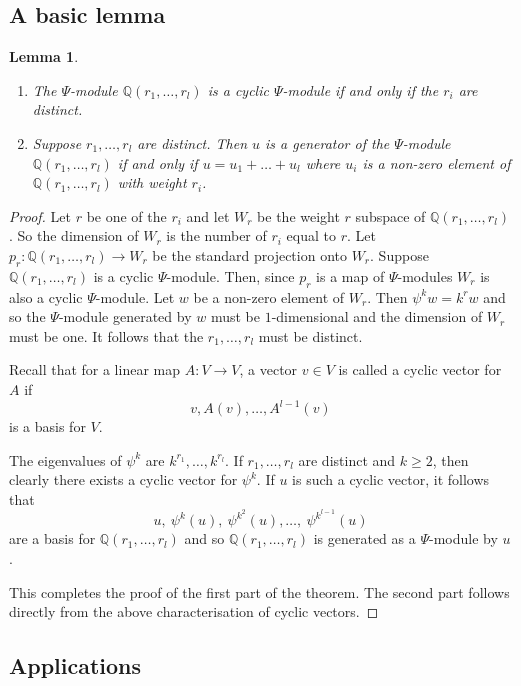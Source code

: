 \documentclass[twoside,a4paper,reqno,11pt]{amsart}
\newtheorem{lemma}{Lemma}[subsection]
\newcommand{\Q}{\mathbb{Q}}
\begin{document}
\subsection{A basic lemma}
\begin{lemma} \label{lem:cyclicpsimodules}
\begin{enumerate}
\item The $\Psi$-module $\Q(r_1, \dots, r_l)$ is a cyclic $\Psi$-module if and only if the $r_i$ are distinct.
\item Suppose $r_1, \dots, r_l$ are distinct. Then $u$ is a generator of the $\Psi$-module $\Q(r_1, \dots, r_l)$ if and only if $u = u_1 + \dots + u_l$ where $u_i$ is a non-zero element of $\Q(r_1, \dots, r_l)$ with weight $r_i$.
\end{enumerate}
\end{lemma}
\begin{proof} 
Let $r$ be one of the $r_i$ and let $W_r$ be the weight $r$ subspace of $\Q(r_1, \dots, r_l)$.  So the dimension of $W_r$ is the number of $r_i$ equal to $r$.  Let $p_r : \Q(r_1, \dots, r_l) \to W_r$ be the standard projection onto $W_r$.  Suppose $\Q(r_1, \dots, r_l)$ is a cyclic $\Psi$-module. Then, since $p_r$ is a map of $\Psi$-modules $W_r$ is also a cyclic $\Psi$-module.  Let $w$ be a non-zero element of $W_r$.  Then $\psi^kw = k^rw$ and so the $\Psi$-module generated by $w$ must be $1$-dimensional and the dimension of $W_r$ must be one.  It follows that the $r_1, \dots, r_l$ must be distinct.  



Recall that for a linear map $A : V \to V$, a vector $v \in V$ is called a cyclic vector for $A$ if 
$$
v, A(v), \dots, A^{l-1}(v)
$$
is a basis for $V$. 
 
The eigenvalues of $\psi^k$ are $k^{r_1}, \dots, k^{r_l}$.  If $r_1, \dots, r_l$ are distinct
and $k\geq 2$, 
then clearly %
there exists a cyclic vector for $\psi^k$. If $u$ is such a cyclic vector, it follows that
$$
u, \ \psi^k(u), \ \psi^{k^2}(u), \ldots, \ \psi^{k^{l-1}}(u)
$$ 
are a basis for $\Q(r_1, \dots, r_l)$ and so $\Q(r_1, \dots, r_l)$ is generated as a $\Psi$-module by $u$.

This completes the proof of the first part of the theorem. The second part follows directly from the above characterisation of cyclic vectors.
\end{proof}

\subsection{Applications} \label{subsec:applications}
\end{document}
